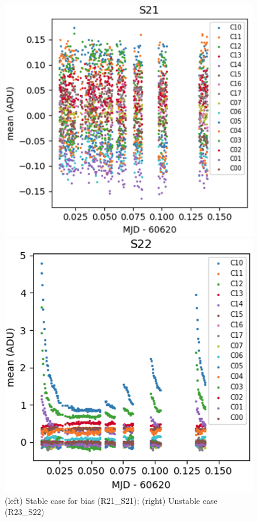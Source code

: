 \begin{figure}[ht]
\centering
\begin{minipage}[b]{0.5\textwidth}
\centering
\includegraphics[width=\textwidth]{figures/E2136_R21_S21.png}
\end{minipage}
\begin{minipage}[b]{0.45\textwidth}
\centering
\includegraphics[width=\textwidth]{figures/E2136_R23_S22.png}
\end{minipage}
\caption{(left) Stable case for bias (R21\_S21); (right) Unstable case (R23\_S22)}
\label{fig:bias-instability}
\end{figure}


